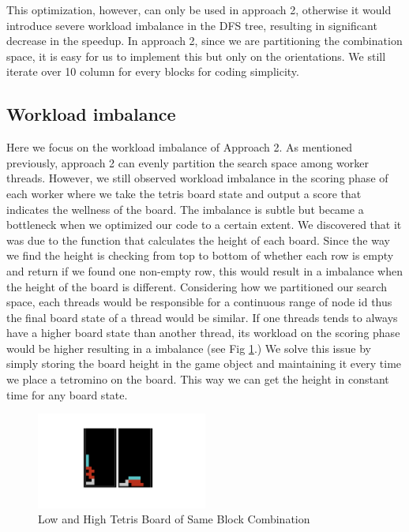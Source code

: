 This optimization, however, can only be used in approach 2, otherwise it would introduce severe workload imbalance in the DFS tree, resulting in significant decrease in the speedup. In approach 2, since we are partitioning the combination space, it is easy for us to implement this but only on the orientations. We still iterate over 10 column for every blocks for coding simplicity. 

\subsection{Workload imbalance}
Here we focus on the workload imbalance of Approach 2. As mentioned previously, approach 2 can evenly partition the search space among worker threads. However, we still observed workload imbalance in the scoring phase of each worker where we take the tetris board state and output a score that indicates the wellness of the board. The imbalance is subtle but became a bottleneck when we optimized our code to a certain extent. We discovered that it was due to the function that calculates the height of each board. Since the way we find the height is checking from top to bottom of whether each row is empty and return if we found one non-empty row, this would result in a imbalance when the height of the board is different. Considering how we partitioned our search space, each threads would be responsible for a continuous range of node id thus the final board state of a thread would be similar. If one threads tends to always have a higher board state than another thread, its workload on the scoring phase would be higher resulting in a imbalance (see Fig \ref{fig:tetris_board}.) 
We solve this issue by simply storing the board height in the game object and maintaining it every time we place a tetromino on the board. This way we can get the height in constant time for any board state.
\begin{figure}[h]
	\centering
	\includegraphics[width=0.5\textwidth]{tetris_board.png}
	\vspace{-3em}
	\caption{Low and High Tetris Board of Same Block Combination}
	\label{fig:tetris_board}
\end{figure}

